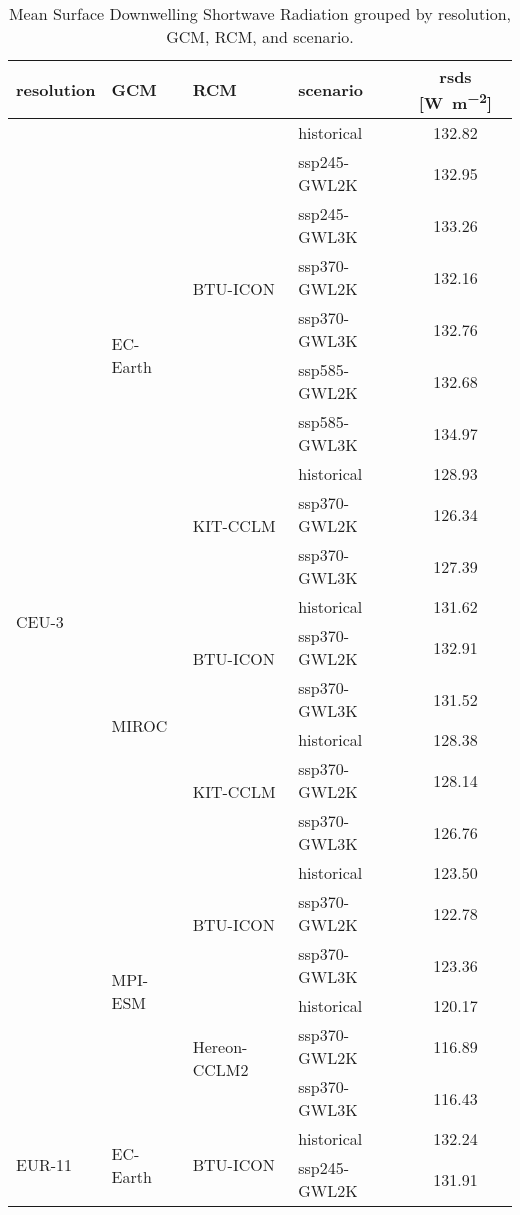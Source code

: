 \begin{table}[!htbp]
\centering
\caption{Mean Surface Downwelling Shortwave Radiation grouped by resolution, GCM, RCM, and scenario.}
\label{Table:rsds_mean_values}
\begin{tabular}{lll|l|c}
\toprule
resolution & GCM & RCM & scenario & rsds [\si{\watt\per\square\meter}] \\
\midrule
\multirow{22}{*}{CEU-3} & \multirow{10}{*}{EC-Earth} & \multirow{7}{*}{BTU-ICON} & historical & 132.82 \\
 &  &  & ssp245-GWL2K & 132.95 \\
 &  &  & ssp245-GWL3K & 133.26 \\
 &  &  & ssp370-GWL2K & 132.16 \\
 &  &  & ssp370-GWL3K & 132.76 \\
 &  &  & ssp585-GWL2K & 132.68 \\
 &  &  & ssp585-GWL3K & 134.97 \\
\cmidrule(lr){3-5}
 &  & \multirow{3}{*}{KIT-CCLM} & historical & 128.93 \\
 &  &  & ssp370-GWL2K & 126.34 \\
 &  &  & ssp370-GWL3K & 127.39 \\
\cmidrule(lr){3-5}
\cmidrule(lr){2-5}
 & \multirow{6}{*}{MIROC} & \multirow{3}{*}{BTU-ICON} & historical & 131.62 \\
 &  &  & ssp370-GWL2K & 132.91 \\
 &  &  & ssp370-GWL3K & 131.52 \\
\cmidrule(lr){3-5}
 &  & \multirow{3}{*}{KIT-CCLM} & historical & 128.38 \\
 &  &  & ssp370-GWL2K & 128.14 \\
 &  &  & ssp370-GWL3K & 126.76 \\
\cmidrule(lr){3-5}
\cmidrule(lr){2-5}
 & \multirow{6}{*}{MPI-ESM} & \multirow{3}{*}{BTU-ICON} & historical & 123.50 \\
 &  &  & ssp370-GWL2K & 122.78 \\
 &  &  & ssp370-GWL3K & 123.36 \\
\cmidrule(lr){3-5}
 &  & \multirow{3}{*}{Hereon-CCLM2} & historical & 120.17 \\
 &  &  & ssp370-GWL2K & 116.89 \\
 &  &  & ssp370-GWL3K & 116.43 \\
\midrule
\multirow{22}{*}{EUR-11} & \multirow{10}{*}{EC-Earth} & \multirow{7}{*}{BTU-ICON} & historical & 132.24 \\
 &  &  & ssp245-GWL2K & 131.91 \\

\end{tabular}
\end{table}
